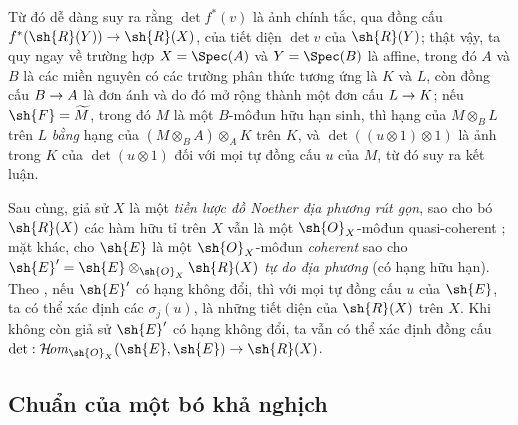 \documentclass[oneside,10pt]{amsart}
\makeatletter
\newcommand{\ega@arrow}[2]{\mathchoice{#1}{#2}{#2}{#2}}
\renewcommand{\to}{\ega@arrow{\longrightarrow}{\rightarrow}}
\def\shHom{\mathcal{H}\!\mathit{om}}
\let\EGAOriginalLabel\label
\renewcommand{\label}[1]{\phantomsection\EGAOriginalLabel{#1}}
\makeatother
\begin{document}
\begin{env}[6.4.9]
Từ đó dễ dàng suy ra rằng $\det f^*(v)$ là ảnh chính tắc, qua đồng cấu $f^*(\sh{R}(Y))\to\sh{R}(X)$, của tiết diện $\det v$ của $\sh{R}(Y)$;
thật vậy, ta quy ngay về trường hợp $X=\Spec(A)$ và $Y=\Spec(B)$ là affine, trong đó $A$ và $B$ là các miền nguyên có các trường phân thức tương ứng là $K$ và $L$, còn đồng cấu $B\to A$ là đơn ánh và do đó mở rộng thành một đơn cấu $L\to K$;
nếu $\sh{F}=\widetilde{M}$, trong đó $M$ là một $B$-môđun hữu hạn sinh, thì hạng của $M\otimes_B L$ trên $L$ \emph{bằng} hạng của $(M\otimes_B A)\otimes_A K$ trên $K$, và $\det((u\otimes1)\otimes1)$ là ảnh trong $K$ của $\det(u\otimes1)$ đối với mọi tự đồng cấu $u$ của $M$, từ đó suy ra kết luận.
\end{env}

\begin{env}[6.4.10]
\label{II.6.4.10}
Sau cùng, giả sử $X$ là một \emph{tiền lược đồ Noether địa phương rút gọn}, sao cho bó $\sh{R}(X)$ các hàm hữu tỉ trên $X$ vẫn là một $\sh{O}_X$-môđun quasi-coherent ;
mặt khác, cho $\sh{E}$ là một $\sh{O}_X$-môđun \emph{coherent} sao cho $\sh{E}'=\sh{E}\otimes_{\sh{O}_X}\sh{R}(X)$ \emph{tự do địa phương} (có hạng hữu hạn).
Theo , nếu $\sh{E}'$ có hạng không đổi, thì với mọi tự đồng cấu $u$ của $\sh{E}$, ta có thể xác định các $\sigma_j(u)$, là những tiết diện của $\sh{R}(X)$ trên $X$.
Khi không còn giả sử $\sh{E}'$ có hạng không đổi, ta vẫn có thể xác định đồng cấu $\det:\shHom_{\sh{O}_X}(\sh{E},\sh{E})\to\sh{R}(X)$.
\end{env}

\subsection{Chuẩn của một bó khả nghịch}
\label{subsection:II.6.5}
\end{document}

